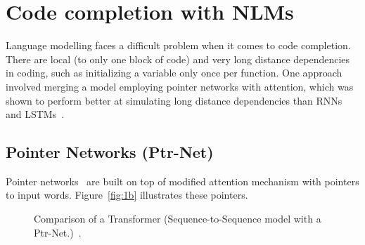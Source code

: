\section{Code completion with NLMs}
Language modelling faces a difficult problem when it comes to code completion. There are local (to only one block of code) and very long distance dependencies in coding, such as initializing a variable only once per function. One approach involved merging a model employing pointer networks with attention, which was shown to perform better at simulating long distance dependencies than RNNs and LSTMs~\cite{ccnlm}.

\subsection{Pointer Networks (Ptr-Net)}
Pointer networks~\cite{pointer} are built on top of modified attention mechanism with pointers to input words. Figure~\ref{fig:1b} illustrates these pointers.

\begin{figure}[hbt!]
\centering 
{}\hfill
{}
\caption{Comparison of a Transformer (Sequence-to-Sequence model with a Ptr-Net.)~\cite{pointer}.} 
\label{fig:pointer}
\end{figure}

